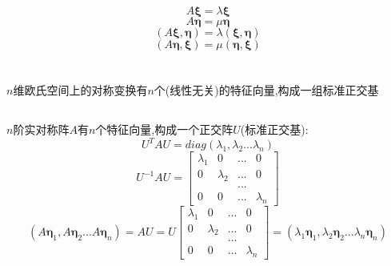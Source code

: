 \documentclass[11pt, a4paper, UTF8]{ctexart}
\begin{document}
\subsubsection{}
\subsubsection{}
\[A\bm\xi=\lambda\bm\xi\]
\[A\bm\eta=\mu\bm\eta\]
\[(A\bm\xi,\bm\eta)=\lambda(\bm\xi,\bm\eta)\]
\[(A\bm\eta,\bm\xi)=\mu(\bm\eta,\bm\xi)\]
\section{}
\subsection{}
$n$维欧氏空间上的对称变换有$n$个(线性无关)的特征向量,构成一组标准正交基
\subsection{}
$n$阶实对称阵$A$有$n$个特征向量,构成一个正交阵$U$(标准正交基):
\[U^TAU=diag(\lambda_1,\lambda_2...\lambda_n)\]
\[U^{-1}AU=\begin{bmatrix}
\lambda_1&0&...&0\\
0&\lambda_2&...&0\\
&&...&\\
0&0&...&\lambda_n
\end{bmatrix}\]
\[(A\bm\eta_1,A\bm\eta_2...A\bm\eta_n)=AU=U\begin{bmatrix}
\lambda_1&0&...&0\\
0&\lambda_2&...&0\\
&&...&\\
0&0&...&\lambda_n
\end{bmatrix}=(\lambda_1\bm\eta_1,\lambda_2\bm\eta_2...\lambda_n\bm\eta_n)\]
\end{document}
